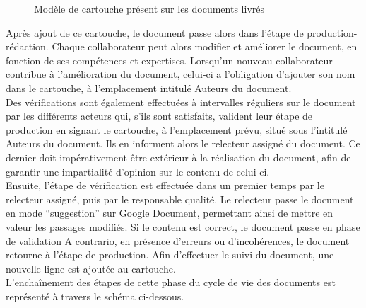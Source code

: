 \begin{figure}[H]
\centering
\label{fig-cartouche}
\caption{Modèle de cartouche présent sur les documents livrés}
\end{figure}

Après ajout de ce cartouche, le document passe alors dans l’étape de \og{}production-rédaction\fg{}. Chaque collaborateur peut alors modifier et améliorer le document, en fonction de ses compétences et expertises. Lorsqu’un nouveau collaborateur contribue à l’amélioration du document, celui-ci a l’obligation d’ajouter son nom dans le cartouche, à l’emplacement intitulé \og{}Auteurs du document\fg{}. \\
 
Des vérifications sont également effectuées à intervalles réguliers sur le document par les différents acteurs qui, s'ils sont satisfaits, valident leur étape de production en signant le cartouche, à l’emplacement prévu, situé sous l’intitulé \og{}Auteurs du document\fg{}. Ils en informent alors le relecteur assigné du document. Ce dernier doit impérativement être extérieur à la réalisation du document, afin de garantir une impartialité d’opinion sur le contenu de celui-ci. \\
 
Ensuite, l’étape de vérification est effectuée dans un premier temps par le relecteur assigné, puis par le responsable qualité. Le relecteur passe le document en mode “suggestion” sur Google Document, permettant ainsi de mettre en valeur les passages modifiés. Si le contenu est correct, le document passe en phase de validation A contrario, en présence d’erreurs ou d’incohérences, le document retourne à l’étape de production. Afin d'effectuer le suivi du document, une nouvelle ligne est ajoutée au cartouche. \\
 
L’enchaînement des étapes de cette phase du cycle de vie des documents est représenté à travers le schéma ci-dessous. \\

